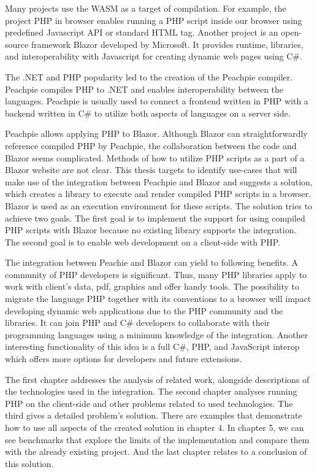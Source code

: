 \par
Many projects use the WASM as a target of compilation.
For example, the project PHP in browser  enables running a PHP script inside our browser using predefined Javascript API or standard HTML tag.
Another project is an open-source framework Blazor  developed by Microsoft.
It provides runtime, libraries, and interoperability with Javascript for creating dynamic web pages using C\#.
\par
{}
The .NET and PHP popularity led to the creation of the Peachpie compiler.
Peachpie  compiles PHP to .NET and enables interoperability between the languages.
Peachpie is usually used to connect a frontend written in PHP with a backend written in C\# to utilize both aspects of languages on a server side.
\par
Peachpie allows applying PHP to Blazor. 
Although Blazor can straightforwardly reference compiled PHP by Peachpie, the collaboration between the code and Blazor seems complicated.
Methods of how to utilize PHP scripts as a part of a Blazor website are not clear. 
This thesis targets to identify use-cases that will make use of the integration between Peachpie and Blazor and suggests a solution, which creates a library to execute and render compiled PHP scripts in a browser.
Blazor is used as an execution environment for these scripts.
The solution tries to achieve two goals.
The first goal is to implement the support for using compiled PHP scripts with Blazor because no existing library supports the integration.
The second goal is to enable web development on a client-side with PHP.
\par
The integration between Peachie and Blazor can yield to following benefits.
A community of PHP developers is significant.
Thus, many PHP libraries apply to work with client's data, pdf, graphics and offer handy tools.
The possibility to migrate the language PHP together with its conventions to a browser will impact developing dynamic web applications due to the PHP community and the libraries.
It can join PHP and C\# developers to collaborate with their programming languages using a minimum knowledge of the integration.
Another interesting functionality of this idea is a full C\#, PHP, and JavaScript interop which offers more options for developers and future extensions.
\par
The first chapter addresses the analysis of related work, alongside descriptions of the technologies used in the integration.
The second chapter analyses running PHP on the client-side and other problems related to used technologies.
The third gives a detailed problem's solution.
There are examples that demonstrate how to use all aspects of the created solution in chapter 4.
In chapter 5, we can see benchmarks that explore the limits of the implementation and compare them with the already existing project.
And the last chapter relates to a conclusion of this solution.
